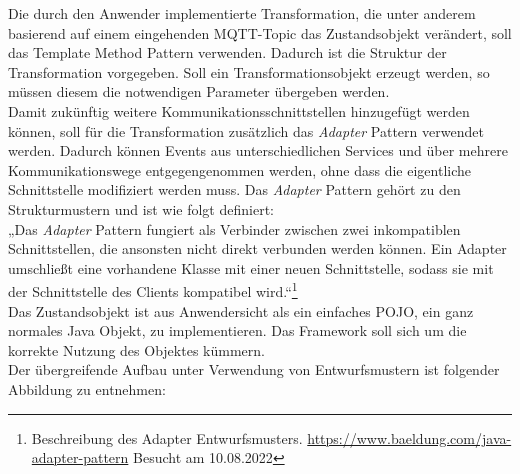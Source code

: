         \linebreak
        Die durch den Anwender implementierte Transformation, die unter anderem basierend auf einem eingehenden \acs{MQTT}-Topic das Zustandsobjekt verändert, soll 
        das {Template Method} Pattern verwenden. Dadurch ist die Struktur der Transformation vorgegeben. Soll ein Transformationsobjekt erzeugt werden, so müssen 
        diesem die notwendigen Parameter übergeben werden. 
        \\
        \linebreak
        Damit zukünftig weitere Kommunikationsschnittstellen hinzugefügt werden können, soll für die Transformation zusätzlich das 
        \textit{Adapter} Pattern verwendet werden. Dadurch können Events aus unterschiedlichen Services und über mehrere Kommunikationswege 
        entgegengenommen werden, ohne dass die eigentliche Schnittstelle modifiziert werden muss. Das \textit{Adapter} Pattern gehört 
        zu den Strukturmustern und ist wie folgt definiert:
        \\
        „Das \textit{Adapter} Pattern fungiert als Verbinder zwischen zwei inkompatiblen Schnittstellen, die ansonsten nicht direkt verbunden werden können. Ein Adapter umschließt 
        eine vorhandene Klasse mit einer neuen Schnittstelle, sodass sie mit der Schnittstelle des Clients kompatibel wird.“\footnote{Beschreibung des Adapter Entwurfsmusters. \url{https://www.baeldung.com/java-adapter-pattern} Besucht am 10.08.2022} \cite{gamma1995adapter}
        \pagebreak
        \\
        Das Zustandsobjekt ist aus Anwendersicht als ein einfaches \ac{POJO}, ein ganz normales Java Objekt, zu implementieren. Das Framework soll sich um die korrekte Nutzung 
        des Objektes kümmern. 
        \\
        \linebreak
        Der übergreifende Aufbau unter Verwendung von Entwurfsmustern ist folgender Abbildung zu entnehmen:
